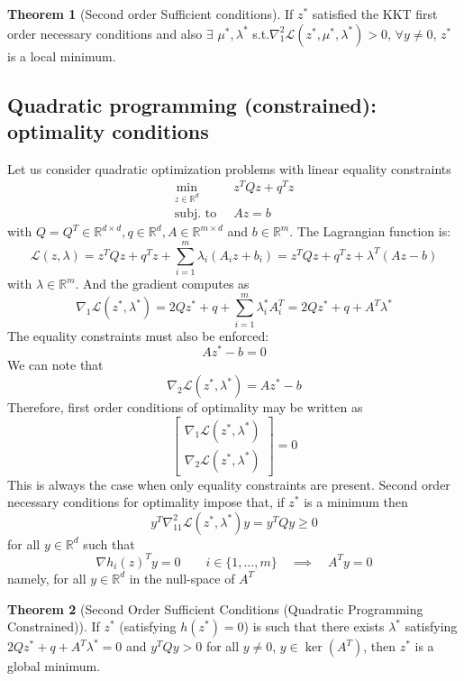 \documentclass[openany]{book}
\newcommand{\R}{\mathbb{R}}               %
\theoremstyle{definition}
\newtheorem{theorem}{Theorem}[section]
\theoremstyle{remark}
\begin{document}
\begin{theorem}[Second order Sufficient conditions]
If $z^*$ satisfied the KKT first order necessary conditions and also $\exists$ $\mu^*,\lambda^*$ s.t.$\nabla_1^2\mathcal{L}(z^*,\mu^*,\lambda^*) > 0$, $\forall y\not=0$, $z^*$ is a local minimum.
\end{theorem}

\subsection{Quadratic programming (constrained): optimality conditions}

Let us consider quadratic optimization problems with linear equality constraints 
\begin{align*}
    \min_{z\in\R^d}\ & z^TQz+q^Tz \\
    \text{subj. to }\ & Az=b
\end{align*}
with $Q=Q^T\in\R^{d\times d}, q\in\R^d, A\in\R^{m\times d}$ and $b\in\R^m$.
The Lagrangian function is:
\[
    \mathcal{L}(z,\lambda) = z^TQz + q^Tz +\displaystyle\sum_{i=1}^{m}\lambda_i(A_iz+b_i) =  z^TQz + q^Tz + \lambda^T(Az-b)
\]
with $\lambda\in\R^m$. And the gradient computes as 
\[
    \nabla_1 \mathcal{L}(z^*,\lambda^*) = 2Qz^* + q + \displaystyle\sum_{i=1}^{m}\lambda_i^*A_i^T =  2Qz^* + q + A^T\lambda^*
\]
The equality constraints must also be enforced: 
\[
    Az^*-b = 0
\]
We can note that 
\[
    \nabla_2\mathcal{L}(z^*,\lambda^*) = Az^*-b
\]
Therefore, first order conditions of optimality may be written as 
\[
    \begin{bmatrix}
        \nabla_1\mathcal{L}(z^*,\lambda^*)\\ \nabla_2\mathcal{L}(z^*,\lambda^*)
    \end{bmatrix} = 0
\]
This is always the case when only equality constraints are present. Second order necessary conditions for optimality impose that, if $z^*$ is a minimum then 
\[
    y^T\nabla^2_{11}\mathcal{L}(z^*,\lambda^*)y = y^TQy \geq 0
\]
for all $y\in\R^d$ such that 
\[
    \nabla h_i(z)^T y = 0 \qquad i\in\{1,\dots,m\} \quad \implies \quad A^Ty = 0
\]
namely, for all $y\in\R^d$ in the null-space of $A^T$

\begin{theorem}[Second Order Sufficient Conditions (Quadratic Programming Constrained)]
If $z^*$ (satisfying $h(z^*)=0$) is such that there exists $\lambda^*$ satisfying $2Qz^* + q + A^T\lambda^* = 0$ and $y^T Q y > 0$ for all $y \neq 0$, $y \in \ker(A^T)$, then $z^*$ is a global minimum.
\end{theorem}
\end{document}
